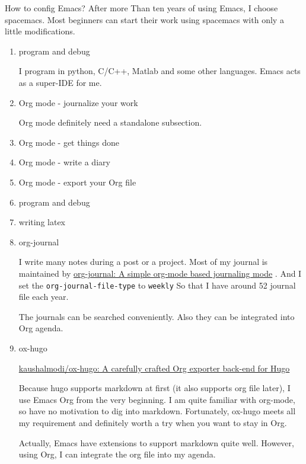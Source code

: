 \documentclass[koma,utopia,letterpaper,captions=tableheading,11pt,listings-sv,microtype,paralist,colorlinks=true,urlcolor=blue]{org-article}
\begin{document}
How to config Emacs? After more Than ten years of using Emacs, I choose
spacemacs. Most beginners can start their work using spacemacs with only a
little modifications.

\begin{enumerate}
\item program and debug
\label{sec:org1ff6423}


I program in python, C/C++, Matlab and some other languages. Emacs acts as a
super-IDE for me.


\item Org mode - journalize your work
\label{sec:org12d2f61}


Org mode definitely need a standalone subsection.

\item Org mode - get things done
\label{sec:org5ad0d61}



\item Org mode - write a diary
\label{sec:org32d0506}

\item Org mode - export your Org file
\label{sec:org4d11418}


\item program and debug
\label{sec:orgeef06a2}


\item writing latex
\label{sec:org9ac1f7a}
\item org-journal
\label{sec:orga432c48}


I write many notes during a post or a project. Most of my journal is maintained
by \href{https://github.com/bastibe/org-journal}{org-journal: A simple org-mode based journaling mode} . And I set the
\texttt{org-journal-file-type} to \texttt{weekly} So that I have around 52 journal file each
year.

The journals can be searched conveniently. Also they can be integrated into Org
agenda.


\item ox-hugo
\label{sec:orgf65906e}


\href{https://github.com/kaushalmodi/ox-hugo}{kaushalmodi/ox-hugo: A carefully crafted Org exporter back-end for Hugo}

Because hugo supports markdown at first (it also supports org file later), I use
Emacs Org from the very beginning. I am quite familiar with org-mode, so have no
motivation to dig into markdown. Fortunately, ox-hugo meets all my requirement
and definitely worth a try when you want to stay in Org.

Actually, Emacs have extensions to support markdown quite well. However, using
Org, I can integrate the org file into my agenda.
\end{enumerate}
\end{document}
